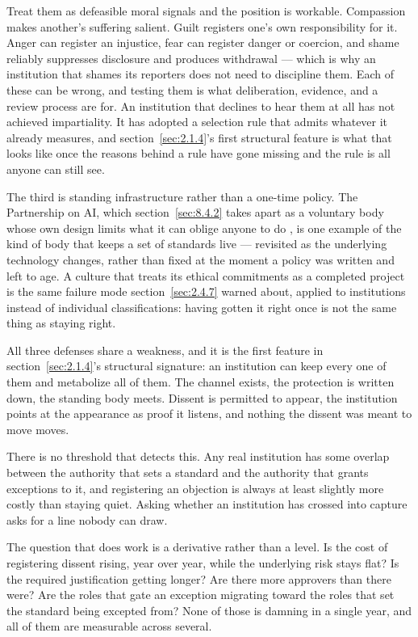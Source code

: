 Treat them as defeasible moral signals and the position is workable. Compassion makes another's suffering salient. Guilt registers one's own responsibility for it. Anger can register an injustice, fear can register danger or coercion, and shame reliably suppresses disclosure and produces withdrawal — which is why an institution that shames its reporters does not need to discipline them. Each of these can be wrong, and testing them is what deliberation, evidence, and a review process are for. An institution that declines to hear them at all has not achieved impartiality. It has adopted a selection rule that admits whatever it already measures, and section~\ref{sec:2.1.4}'s first structural feature is what that looks like once the reasons behind a rule have gone missing and the rule is all anyone can still see.

The third is standing infrastructure rather than a one-time policy. The Partnership on AI, which section~\ref{sec:8.4.2} takes apart as a voluntary body whose own design limits what it can oblige anyone to do \autocite{partnershiponai2016}, is one example of the kind of body that keeps a set of standards live — revisited as the underlying technology changes, rather than fixed at the moment a policy was written and left to age. A culture that treats its ethical commitments as a completed project is the same failure mode section~\ref{sec:2.4.7} warned about, applied to institutions instead of individual classifications: having gotten it right once is not the same thing as staying right.

All three defenses share a weakness, and it is the first feature in section~\ref{sec:2.1.4}'s structural signature: an institution can keep every one of them and metabolize all of them. The channel exists, the protection is written down, the standing body meets. Dissent is permitted to appear, the institution points at the appearance as proof it listens, and nothing the dissent was meant to move moves.

There is no threshold that detects this. Any real institution has some overlap between the authority that sets a standard and the authority that grants exceptions to it, and registering an objection is always at least slightly more costly than staying quiet. Asking whether an institution has crossed into capture asks for a line nobody can draw.

The question that does work is a derivative rather than a level. Is the cost of registering dissent rising, year over year, while the underlying risk stays flat? Is the required justification getting longer? Are there more approvers than there were? Are the roles that gate an exception migrating toward the roles that set the standard being excepted from? None of those is damning in a single year, and all of them are measurable across several.

